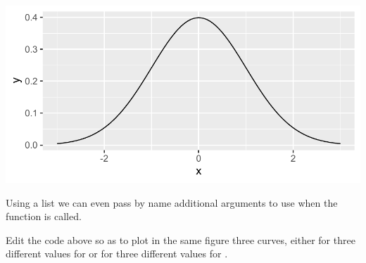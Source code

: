 \documentclass[krantz2]{krantz}\usepackage{knitr}
\begin{document}
\begin{knitrout}\footnotesize
{}\color{fgcolor}\begin{kframe}
\begin{alltt}
\hlstd{(}\hlstd{(} \hlstd{=} \hlopt{-}\hlopt{:}\hlstd{),} \hlstd{(}  \hlopt{+}
  \hlstd{(} 
\end{alltt}
\end{kframe}

{\centering \includegraphics[width=.7\textwidth]{figure/pos-function-plot-01-1} 

}



\end{knitrout}

Using a list we can even pass by name additional arguments to use when the function is called.

\begin{knitrout}\footnotesize
{}\color{fgcolor}\begin{kframe}
\begin{alltt}
\hlstd{(}\hlstd{(} \hlstd{=} \hlopt{-}\hlopt{:}\hlstd{),} \hlstd{(}  \hlopt{+}
  \hlstd{(}   \hlstd{=} \hlstd{(} \hlstd{=} \hlstd{,}  \hlstd{=} \hlstd{))}
\end{alltt}
\end{kframe}
\end{knitrout}

\begin{playground}
Edit the code above so as to plot in the same figure three curves, either for three different values for  or for three different values for .
\end{playground}
\end{document}
